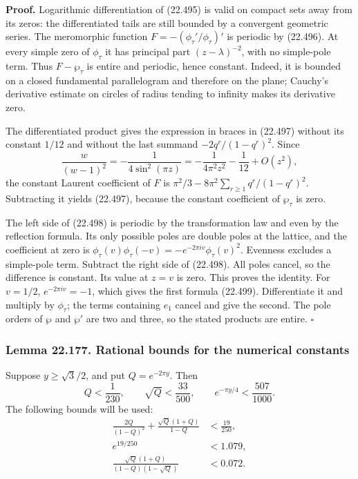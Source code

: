 \documentclass[
  11pt,
  a4paper,
]{article}
\begin{document}
\textbf{Proof.} Logarithmic differentiation of (22.495) is valid on
compact sets away from its zeros: the differentiated tails are still
bounded by a convergent geometric series. The meromorphic function
\(F=-(\phi_\tau'/\phi_\tau)'\) is periodic by (22.496). At every simple
zero of \(\phi_\tau\) it has principal part \((z-\lambda)^{-2}\), with
no simple-pole term. Thus \(F-\wp_\tau\) is entire and periodic, hence
constant. Indeed, it is bounded on a closed fundamental parallelogram
and therefore on the plane; Cauchy's derivative estimate on circles of
radius tending to infinity makes its derivative zero.

The differentiated product gives the expression in braces in (22.497)
without its constant \(1/12\) and without the last summand
\(-2q^r/(1-q^r)^2\). Since \[
 \frac{w}{(w-1)^2}
 =-\frac1{4\sin^2(\pi z)}
 =-\frac1{4\pi^2z^2}-\frac1{12}+O(z^2),
 \tag{22.500}
\] the constant Laurent coefficient of \(F\) is
\(\pi^2/3-8\pi^2\sum_{r\ge1}q^r/(1-q^r)^2\). Subtracting it yields
(22.497), because the constant coefficient of \(\wp_\tau\) is zero.

The left side of (22.498) is periodic by the transformation law and even
by the reflection formula. Its only possible poles are double poles at
the lattice, and the coefficient at zero is \(\phi_\tau(v)\phi_\tau(-v)
=-e^{-2\pi iv}\phi_\tau(v)^2\). Evenness excludes a simple-pole term.
Subtract the right side of (22.498). All poles cancel, so the difference
is constant. Its value at \(z=v\) is zero. This proves the identity. For
\(v=1/2\), \(e^{-2\pi iv}=-1\), which gives the first formula (22.499).
Differentiate it and multiply by \(\phi_\tau\); the terms containing
\(e_1\) cancel and give the second. The pole orders of \(\wp\) and
\(\wp'\) are two and three, so the stated products are entire.
\(\square\)

\subsubsection{Lemma 22.177. Rational bounds for the numerical
constants}\label{lemma-22.177.-rational-bounds-for-the-numerical-constants}

Suppose \(y\ge\sqrt3/2\), and put \(Q=e^{-2\pi y}\). Then \[
 Q<\frac1{230},\qquad
 \sqrt Q<\frac{33}{500},\qquad
 e^{-\pi y/4}<\frac{507}{1000}.
 \tag{22.501}
\] The following bounds will be used: \[
 \begin{split}
 \frac{2Q}{(1-Q)^2}+\frac{\sqrt Q(1+Q)}{1-Q}&<\frac{19}{250},\\
 e^{19/250}&<1.079,\\
 \frac{\sqrt Q(1+Q)}{(1-Q)(1-\sqrt Q)}&<0.072.
 \end{split}
 \tag{22.502}
\]
\end{document}
